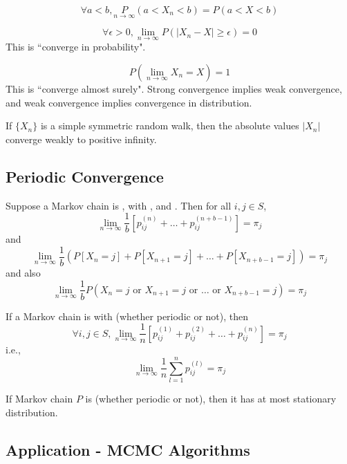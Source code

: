 \documentclass[11pt]{article}
\newcommand{\dur}[3]{{#1}_{#2}^{({#3})}}
\renewcommand{\limit}[1]{\underset{{#1} \rightarrow \infty}{\lim}}
\begin{document}
    $$\forall a < b, \underset{n \rightarrow \infty} P(a < X_n < b) = P(a < X < b)$$

    $$\forall \epsilon > 0, \underset{n \rightarrow \infty}{\lim} P(|X_n - X| \geq \epsilon) = 0$$
    \remark This is ``converge in probability".
    
    $$P(\underset{n \rightarrow \infty}{\lim} X_n = X) = 1$$
    \remark This is ``converge almost surely".
    \remark Strong convergence implies weak convergence, and weak convergence implies convergence in distribution.
    
    
    \proposition If $\{X_n\}$ is a simple symmetric random walk, then the absolute values $|X_n|$ converge weakly to positive infinity.
    
    \subsection{Periodic Convergence}
    Suppose a Markov chain is , with , and . Then for all $i, j \in S$,
    $$\limit{n} \frac{1}{b}[\dur{p}{ij}{n} + \hdots + \dur{p}{ij}{n + b -1}] = \pi_j$$
    and 
    $$\limit{n} \frac{1}{b}(P[X_n = j] + P[X_{n+1} = j] + \hdots + P[X_{n+b-1} = j]) = \pi_j$$
    and also
    $$\limit{n} \frac{1}{b}P(X_n = j \text{ or } X_{n+1} = j \text{ or } \hdots \text{ or } X_{n+b-1} = j ) = \pi_j$$
    
    If a Markov chain is  with  (whether periodic or not), then 
    $$\forall i, j \in S, \limit{n} \frac{1}{n}[\dur{p}{ij}{1} + \dur{p}{ij}{2} + \hdots + \dur{p}{ij}{n}] = \pi_j$$
    i.e.,
    $$\limit{n} \frac{1}{n}\sum_{l=1}^n \dur{p}{ij}{l} = \pi_j$$
    
     If Markov chain $P$ is  (whether periodic or not), then it has at most  stationary distribution.
    
    \subsection{Application - MCMC Algorithms}
    
\end{document}
